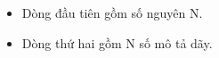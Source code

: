 \begin{itemize}
	\item     Dòng đầu tiên gồm số nguyên N.   
	\item     Dòng thứ hai gồm N số mô tả dãy.   
\end{itemize}